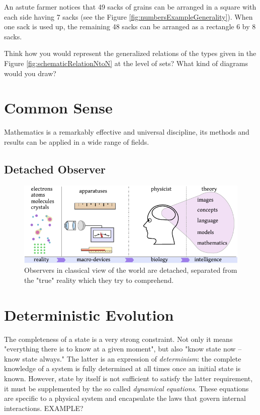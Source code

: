 An astute farmer notices that 49 sacks of grains can be arranged
in a square with each side having 7 sacks (see the Figure
\ref{fig:numbersExampleGenerality}). When one sack is used up, the
remaining 48 sacks can be arranged as a rectangle 6 by 8 sacks.


\begin{exercise}\label{exe:relationsGeneral}
Think how you would represent the generalized relations of the types
given in the Figure \ref{fig:schematicRelationNtoN} at the level of
sets? What kind of diagrams would you draw?
\end{exercise}

\section{Common Sense}
Mathematics is a remarkably effective and universal discipline, its
methods and
results can be applied in a wide range of fields.
\subsection{Detached Observer}
\begin{figure}[htbp]
	\centering
	\includegraphics[scale=1.0]{commonSensePerception}
	\caption{Observers in classical view of the world are detached, separated from the "true" reality which they try to comprehend.}
	\label{fig:commonSensePerception}
\end{figure}


\section{Deterministic Evolution}
The completeness of a state is a very strong constraint. Not only it means "everything there is to know at a given moment", but also "know state now -- know state always." The latter is an expression of \emph{determinism}: the complete knowledge of a system is fully determined at all times once an initial state is known. However, state by itself  is not sufficient to satisfy the latter requirement, it must be supplemented by the so called \emph{dynamical equations}. These equations are specific to a physical system and encapsulate the laws that govern internal interactions. EXAMPLE?

